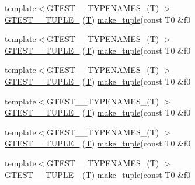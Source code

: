 \begin{DoxyCompactItemize}
\item 
{\footnotesize template$<$G\-T\-E\-S\-T\-\_\-\_\-\-T\-Y\-P\-E\-N\-A\-M\-E\-S\-\_\-(\-T) $>$ }\\\hyperlink{namespacestd_1_1tr1_a6f8af2da768a7ea1e48b2700d1288166}{G\-T\-E\-S\-T\-\_\-\_\-\-T\-U\-P\-L\-E\-\_\-} (\hyperlink{calib3d_8hpp_a3efb9551a871ddd0463079a808916717}{T}) \hyperlink{namespacestd_1_1tr1_af7e12a0f5b5791b5b7c49a5a17b85359}{make\-\_\-tuple}(const T0 \&f0
\item 
{\footnotesize template$<$G\-T\-E\-S\-T\-\_\-\_\-\-T\-Y\-P\-E\-N\-A\-M\-E\-S\-\_\-(\-T) $>$ }\\\hyperlink{namespacestd_1_1tr1_a31cde155977a4544af2b44b51ffe69ac}{G\-T\-E\-S\-T\-\_\-\_\-\-T\-U\-P\-L\-E\-\_\-} (\hyperlink{calib3d_8hpp_a3efb9551a871ddd0463079a808916717}{T}) \hyperlink{namespacestd_1_1tr1_af7e12a0f5b5791b5b7c49a5a17b85359}{make\-\_\-tuple}(const T0 \&f0
\item 
{\footnotesize template$<$G\-T\-E\-S\-T\-\_\-\_\-\-T\-Y\-P\-E\-N\-A\-M\-E\-S\-\_\-(\-T) $>$ }\\\hyperlink{namespacestd_1_1tr1_a61277f5af24b20fce87a9fd94307ab34}{G\-T\-E\-S\-T\-\_\-\_\-\-T\-U\-P\-L\-E\-\_\-} (\hyperlink{calib3d_8hpp_a3efb9551a871ddd0463079a808916717}{T}) \hyperlink{namespacestd_1_1tr1_af7e12a0f5b5791b5b7c49a5a17b85359}{make\-\_\-tuple}(const T0 \&f0
\item 
{\footnotesize template$<$G\-T\-E\-S\-T\-\_\-\_\-\-T\-Y\-P\-E\-N\-A\-M\-E\-S\-\_\-(\-T) $>$ }\\\hyperlink{namespacestd_1_1tr1_a29c8efcb79a4749e079b704c418266e6}{G\-T\-E\-S\-T\-\_\-\_\-\-T\-U\-P\-L\-E\-\_\-} (\hyperlink{calib3d_8hpp_a3efb9551a871ddd0463079a808916717}{T}) \hyperlink{namespacestd_1_1tr1_af7e12a0f5b5791b5b7c49a5a17b85359}{make\-\_\-tuple}(const T0 \&f0
\item 
{\footnotesize template$<$G\-T\-E\-S\-T\-\_\-\_\-\-T\-Y\-P\-E\-N\-A\-M\-E\-S\-\_\-(\-T) $>$ }\\\hyperlink{namespacestd_1_1tr1_a6afad1f98814ccc897d0b02bc6fc4e7d}{G\-T\-E\-S\-T\-\_\-\_\-\-T\-U\-P\-L\-E\-\_\-} (\hyperlink{calib3d_8hpp_a3efb9551a871ddd0463079a808916717}{T}) \hyperlink{namespacestd_1_1tr1_af7e12a0f5b5791b5b7c49a5a17b85359}{make\-\_\-tuple}(const T0 \&f0
\item 
{\footnotesize template$<$G\-T\-E\-S\-T\-\_\-\_\-\-T\-Y\-P\-E\-N\-A\-M\-E\-S\-\_\-(\-T) $>$ }\\\hyperlink{namespacestd_1_1tr1_aa636d3269bf1f368a7bc09ff158bc482}{G\-T\-E\-S\-T\-\_\-\_\-\-T\-U\-P\-L\-E\-\_\-} (\hyperlink{calib3d_8hpp_a3efb9551a871ddd0463079a808916717}{T}) \hyperlink{namespacestd_1_1tr1_af7e12a0f5b5791b5b7c49a5a17b85359}{make\-\_\-tuple}(const T0 \&f0

\end{DoxyCompactItemize}
